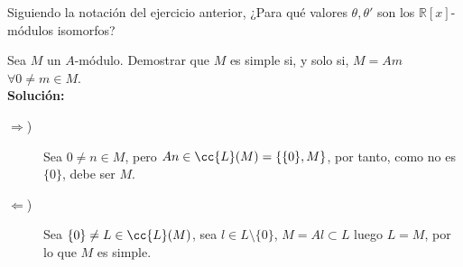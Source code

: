 \begin{ejercicio}
    Siguiendo la notación del ejercicio anterior, ¿Para qué valores $\theta, \theta'$ son los $\mathbb{R}[x]$-módulos isomorfos?
\end{ejercicio}
\begin{ejercicio}
    Sea $M$ un $A$-módulo. Demostrar que $M$ es simple si, y solo si, $M = Am$ $\forall 0 \neq m \in M$. \\
    
    \noindent
    \textbf{Solución:}
    \begin{description}
        \item [$\Longrightarrow$)] Sea $0 \neq n \in M$, pero $An \in \cc{L}(M) = \{\{0\}, M\}$, por tanto, como no es $\{0\}$, debe ser $M$.
        \item [$\Longleftarrow$)] Sea $\{0\} \neq L \in \cc{L}(M)$, sea $l \in L \setminus \{0\}$, $M = Al \subset L$ luego $L = M$, por lo que $M$ es simple.
    \end{description}
\end{ejercicio}

